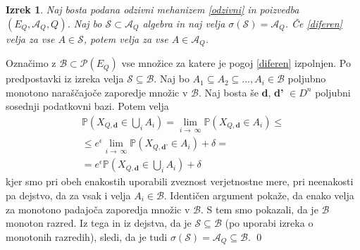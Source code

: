 \documentclass[12pt,a4paper]{amsart}
\theoremstyle{definition} %
\theoremstyle{plain} %
\newtheorem{izrek}[definicija]{Izrek}
\begin{document}
\begin{izrek}
 Naj bosta podana odzivni mehanizem \eqref{odzivni} in poizvedba $(E_Q, \mathcal{A}_Q, Q)$. Naj bo $\mathcal{S} \subset \mathcal{A}_Q$ algebra in naj velja $\sigma(\mathcal{S}) = \mathcal{A}_Q$. Če \eqref{diferen} velja za vse $A \in \mathcal{S}$, potem velja za vse $A \in \mathcal{A}_Q$. 
\end{izrek}
\proof 
Označimo z $\mathcal{B} \subset \mathcal{P}(E_Q) $ vse množice za katere je pogoj \eqref{diferen} izpolnjen. Po predpostavki iz izreka velja $\mathcal{S} \subseteq \mathcal{B}$. Naj bo $A_1 \subseteq A_2 \subseteq ... , A_i \in \mathcal{B}$  poljubno monotono naraščajoče zaporedje množic v $\mathcal{B}$. Naj bosta še \textbf{d}, \textbf{d'} $\in D^n$ poljubni sosednji podatkovni bazi. Potem velja 
\begin{equation*}
\begin{split}
\mathbb{P}(X_{Q,\textbf{d}} \in \bigcup_{i} A_i) = \lim_{i \to\ \infty} \mathbb{P}(X_{Q,\textbf{d}} \in A_i)  \leq \\
\leq  e^\epsilon\lim_{i \to\ \infty} \mathbb{P}(X_{Q,\textbf{d'}} \in A_i) + \delta = \\
=  e^\epsilon \mathbb{P}(X_{Q,\textbf{d}} \in \bigcup_{i} A_i) + \delta
\end{split}
\end{equation*}
kjer smo pri obeh enakostih uporabili zveznost verjetnostne mere, pri neenakosti pa dejstvo, da za vsak i velja $A_i \in \mathcal{B}$. Identičen argument pokaže, da enako velja za monotono padajoča zaporedja množic v $\mathcal{B}$. S tem smo pokazali, da je $\mathcal{B}$ monoton razred. Iz tega in iz dejstva, da je $\mathcal{S} \subseteq \mathcal{B}$ (po uporabi izreka o monotonih razredih), sledi, da je tudi $\sigma(\mathcal{S}) = \mathcal{A}_Q \subseteq \mathcal{B}$.
\qed
\newline
\end{document}
